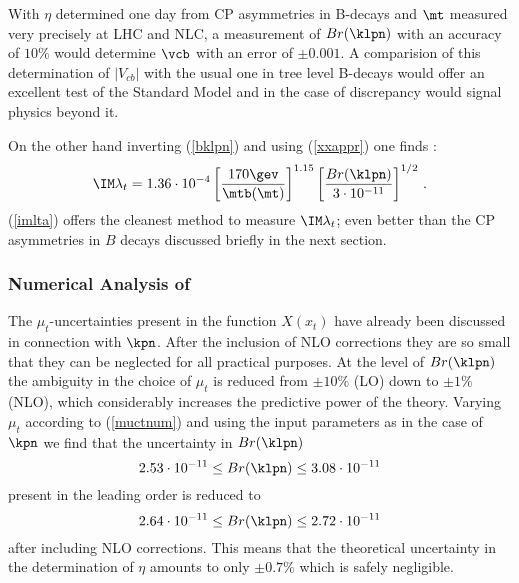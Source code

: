 With $\eta$ 
determined one day from CP asymmetries in B-decays
and $\mt$ measured very precisely at LHC and NLC,
a measurement of $Br(\klpn)$ with an accuracy of $10\%$
would determine $\vcb$ with an error of $\pm 0.001$.
A comparision of
this determination of $|V_{cb}|$ with the usual one in tree level
B-decays would offer an excellent test of the Standard Model
and in the case of discrepancy would signal physics beyond 
it.

On the other hand inverting (\ref{bklpn}) and using (\ref{xxappr})
 one finds \cite{BB96}:
\begin{equation}\label{imlta}
\IM\lambda_t=1.36\cdot 10^{-4} 
\left[\frac{170\gev}{\mtb(\mt)}\right]^{1.15}
\left[\frac{Br(\klpn)}{3\cdot 10^{-11}}\right]^{1/2}\,.
\end{equation}
(\ref{imlta}) offers
 the cleanest method to measure $\IM\lambda_t$;
even better than the CP asymmetries
in $B$ decays discussed briefly in the next section.
\subsubsection{Numerical Analysis of \klpnn}
\label{sec:Kpnn:NumericalKL}
The $\mu_t$-uncertainties present in the function $X(x_t)$ have 
already been
discussed in connection with $\kpn$. After the inclusion of NLO
corrections they are so small that they can be neglected for all
practical purposes. 
At the level of $Br(\klpn)$ the ambiguity in the choice of $\mu_t$ is
reduced from $\pm 10\%$ (LO) down to $\pm 1\%$ (NLO), which
considerably increases the predictive power of the theory. Varying
$\mu_t$ according to (\ref{muctnum}) and using the input parameters
as in the case of $\kpn$ we find that the uncertainty
in $Br(\klpn)$
\begin{equation}\label{varbklpnLO}
2.53\cdot 10^{-11}\leq Br(\klpn)\leq 3.08\cdot 10^{-11}
\end{equation}
present in the leading order is reduced to
\begin{equation}\label{varbklpnNLO}
2.64\cdot 10^{-11}\leq Br(\klpn)\leq 2.72\cdot 10^{-11}
\end{equation}
after including NLO corrections. This means that the theoretical
uncertainty in the determination of $\eta$ amounts to only $\pm 0.7\%$
which is safely negligible.

